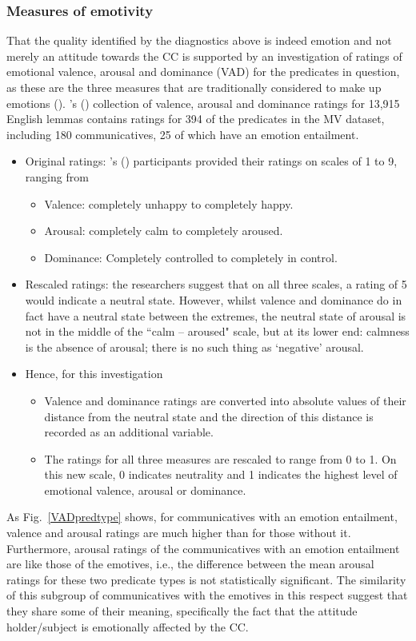 \documentclass[11pt,fleqn]{article}
\newcommand{\figref}[1]{Fig.~\ref{#1}}
\newcommand{\6}{\mbox{$[\hspace*{-.6mm}[$}}
\newcommand{\9}{\mbox{$]\hspace*{-.6mm}]$}}
\newcommand{\citepos}[1]{\citeauthor{#1}'s (\citeyear{#1})}
\begin{document}
\subsubsection{Measures of emotivity}
That the quality identified by the diagnostics above is indeed emotion and not merely an attitude towards the CC is supported by an investigation of ratings of emotional valence, arousal and dominance (VAD) for the predicates in question, as these are the three measures that are traditionally considered to make up emotions (\citealt{warriner-etal2013}). \citepos{warriner-etal2013} collection of valence, arousal and dominance ratings for 13,915 English lemmas contains ratings for 394 of the predicates in the MV dataset, including 180 communicatives, 25 of which have an emotion entailment.
\begin{itemize}
	\item Original ratings: \citepos{warriner-etal2013} participants provided their ratings on scales of 1 to 9, ranging from 
	\begin{itemize}
		\item Valence: completely unhappy to completely happy.
		\item Arousal: completely calm to completely aroused.
		\item Dominance: Completely controlled to completely in control.
	\end{itemize}
	\item Rescaled ratings: the researchers suggest that on all three scales, a rating of 5 would indicate a neutral state. However, whilst valence and dominance do in fact have a neutral state between the extremes, the neutral state of arousal is not in the middle of the ``calm – aroused" scale, but at its lower end: calmness is the absence of arousal; there is no such thing as ‘negative’ arousal. 
	\item Hence, for this investigation
	\begin{itemize}
		\item Valence and dominance ratings are converted into absolute values of their distance from the neutral state and the direction of this distance is recorded as an additional variable. 
		\item The ratings for all three measures are rescaled to range from 0 to 1. On this new scale, 0 indicates neutrality and 1 indicates the highest level of emotional valence, arousal or dominance.
	\end{itemize}
\end{itemize}
As \figref{VADpredtype} shows, for communicatives with an emotion entailment, valence and arousal ratings are much higher than for those without it. Furthermore, arousal ratings of the communicatives with an emotion entailment are like those of the emotives, i.e., the difference between the mean arousal ratings for these two predicate types is not statistically significant. The similarity of this subgroup of communicatives with the emotives in this respect suggest that they share some of their meaning, specifically the fact that the attitude holder/subject is emotionally affected by the CC.
\end{document}
